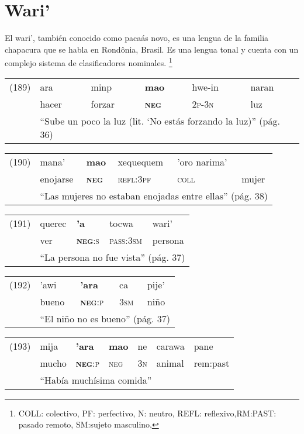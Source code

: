 \section*{Wari'}

\noindent El wari', también conocido como pacaás novo, es una lengua de la familia chapacura que se habla en Rondônia, Brasil. Es una lengua tonal y cuenta con un complejo sistema de clasificadores nominales.
\footnote{COLL: colectivo, PF: perfectivo, N: neutro, REFL: reflexivo,RM:PAST: pasado remoto, SM:sujeto masculino, }
\vspace{0.5cm}

{\setmainfont{Charis SIL} 

\begin{tabular}{llllll}
(189) & ara & minp & \textbf{mao} & hwe-in & naran \\
& hacer & forzar & \textsc{\textbf{neg}} & \textsc{2p-3n} & luz \\
& \multicolumn{5}{l}{``Sube un poco la luz (lit. ‘No estás forzando la luz)'' (pág. 36)}
\end{tabular} \vspace{0.5cm}

\begin{tabular}{llllll}
(190) & mana' & \textbf{mao} & xequequem & 'oro narima' \\
& enojarse & \textsc{\textbf{neg}} & \textsc{refl:3pf} & \textsc{coll} & mujer \\
& \multicolumn{5}{l}{``Las mujeres no estaban enojadas entre ellas'' (pág. 38)}
\end{tabular} \vspace{0.5cm}

\begin{tabular}{lllll}
(191) & querec & \textbf{'a} & tocwa & wari' \\
& ver & \textsc{\textbf{neg}:s} & \textsc{pass:3sm} & persona \\
& \multicolumn{4}{l}{``La persona no fue vista'' (pág. 37)}
\end{tabular} \vspace{0.5cm}

\begin{tabular}{lllll}
(192) & 'awi & \textbf{'ara} & ca & pije' \\
& bueno & \textsc{\textbf{neg}:p} & \textsc{3sm} & niño \\
& \multicolumn{4}{l}{``El niño no es bueno'' (pág. 37)}
\end{tabular} \vspace{0.5cm}

\begin{tabular}{lllllll}
(193) & mija & \textbf{'ara} & \textbf{mao} & ne & carawa & pane \\
& mucho & \textsc{\textbf{neg}:p} & \textsc{neg} & \textsc{3n} & animal & rem:past \\
& \multicolumn{6}{l}{``Había muchísima comida''}
\end{tabular} \vspace{0.5cm}

}

